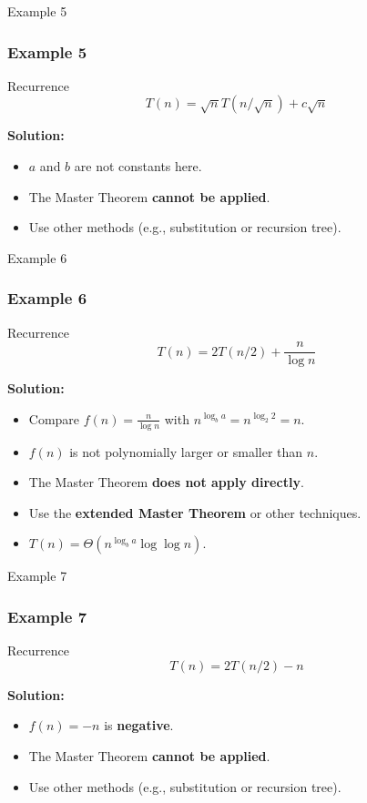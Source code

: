 \documentclass[10pt,aspectratio=43]{beamer}
\begin{document}

\begin{frame}{Example 5}
\frametitle{Example 5}
  \begin{block}{Recurrence}
\[
T(n) = \sqrt{n} T(n/\sqrt{n}) + c\sqrt{n}
\]
  \end{block}

\textbf{Solution:}
\begin{itemize}
    \item \( a \) and \( b \) are not constants here.
    \item The Master Theorem \textbf{cannot be applied}.
    \item Use other methods (e.g., substitution or recursion tree).
\end{itemize}
\end{frame}


\begin{frame}{Example 6}
\frametitle{Example 6}
  \begin{block}{Recurrence}
\[
T(n) = 2T(n/2) + \frac{n}{\log n}
\]
  \end{block}

\textbf{Solution:}
\begin{itemize}
    \item Compare \( f(n) = \frac{n}{\log n} \) with \( n^{\log_b a} = n^{\log_2 2} = n \).
    \item \( f(n) \) is not polynomially larger or smaller than \( n \).
    \item The Master Theorem \textbf{does not apply directly}.
    \item Use the \textbf{extended Master Theorem} or other techniques.
    \item \( T(n) = \Theta(n^{\log_b a} \log \log n) \).
\end{itemize}
\end{frame}


\begin{frame}{Example 7}
\frametitle{Example 7}
  \begin{block}{Recurrence}
\[
T(n) = 2T(n/2) - n
\]
  \end{block}

\textbf{Solution:}
\begin{itemize}
    \item \( f(n) = -n \) is \textbf{negative}.
    \item The Master Theorem \textbf{cannot be applied}.
    \item Use other methods (e.g., substitution or recursion tree).
\end{itemize}
\end{frame}
\end{document}
